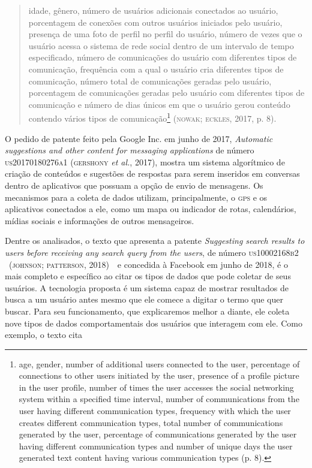 \begin{quote}
idade, gênero, número de usuários adicionais conectados ao usuário,
porcentagem de conexões com outros usuários iniciados pelo usuário,
presença de uma foto de perfil no perfil do usuário, número de vezes que
o usuário acessa o sistema de rede social dentro de um intervalo de
tempo especificado, número de comunicações do usuário com diferentes
tipos de comunicação, frequência com a qual o usuário cria diferentes
tipos de comunicação, número total de comunicações geradas pelo usuário,
porcentagem de comunicações geradas pelo usuário com diferentes tipos de
comunicação e número de dias únicos em que o usuário gerou conteúdo
contendo vários tipos de comunicação\footnote{age, gender, number of
  additional users connected to the user, percentage of connections to
  other users initiated by the user, presence of a profile picture in
  the user profile, number of times the user accesses the social
  networking system within a specified time interval, number of
  communications from the user having different communication types,
  frequency with which the user creates different communication types,
  total number of communications generated by the user, percentage of
  communications generated by the user having different communication
  types and number of unique days the user generated text content having
  various communication types (p. 8).} (\textsc{nowak}; \textsc{eckles}, 2017, p. 8).
\end{quote}

O pedido de patente feito pela Google Inc. em junho de 2017,
\emph{Automatic suggestions and other content for messaging
applications} de número \textsc{us20170180276a1} (\textsc{gershony} \emph{et al.}, 2017),
mostra um sistema algorítmico de criação de conteúdos e sugestões de
respostas para serem inseridos em conversas dentro de aplicativos que
possuam a opção de envio de mensagens. Os mecanismos para a coleta de
dados utilizam, principalmente, o \textsc{gps} e os aplicativos conectados a ele,
como um mapa ou indicador de rotas, calendários, mídias sociais e
informações de outros mensageiros.

Dentre os analisados, o texto que apresenta a patente \emph{Suggesting
search results to users before receiving any search query from the
users}, de número \textsc{us10002168b2} ~(\textsc{johnson; patterson}, 2018)~~e concedida
à Facebook em junho de 2018, é o mais completo e específico ao citar os
tipos de dados que pode coletar de seus usuários. A tecnologia proposta
é um sistema capaz de mostrar resultados de busca a um usuário antes
mesmo que ele comece a digitar o termo que quer buscar. Para seu
funcionamento, que explicaremos melhor a diante, ele coleta nove tipos
de dados comportamentais dos usuários que interagem com ele. Como
exemplo, o texto cita

